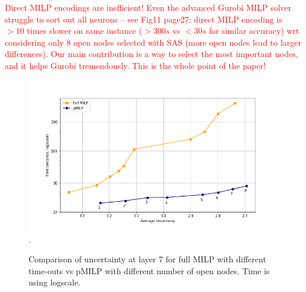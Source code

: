 \textcolor{red}{Direct MILP encodings are inefficient! Even the advanced Gurobi MILP solver struggle to sort out all neurons – see Fig11 page27: direct MILP encoding is $>10$ times slower on same instance ($>300s$ vs $<30s$ for similar accuracy) wrt considering only 8 open nodes selected with SAS (more open nodes lead to larger differences). Our main contribution is a way to select the most important nodes, and it helps Gurobi tremendously. This is the whole point of the paper!}

\begin{figure}[h!]\hspace*{-0.8cm}
	\includegraphics[scale=0.6]{Layer7_comparison.png}.
	\caption{Comparison of uncertainty at layer 7 for full MILP with different time-outs vs pMILP with different number of open nodes. Time is using logscale.}
	\label{fig4}
\end{figure}



